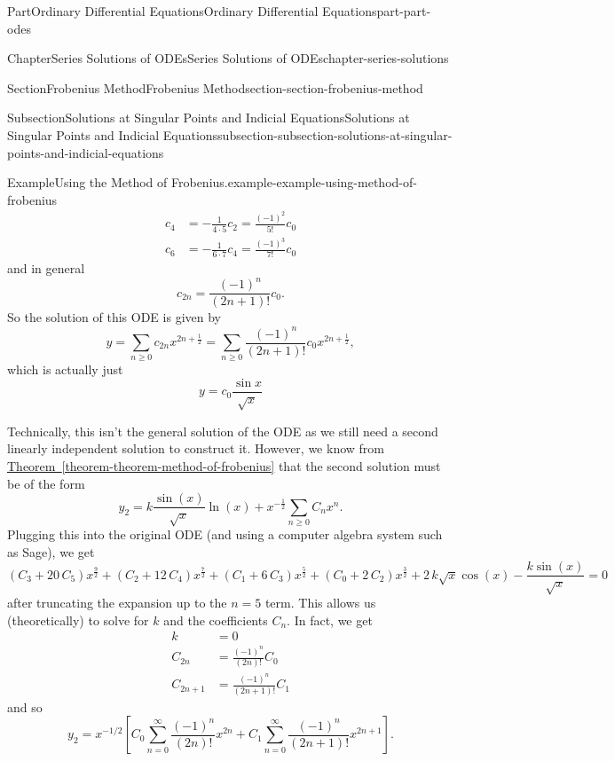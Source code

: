 \documentclass[twoside,10pt,]{book}
\newcommand{\xreffont}{\relax}
\numberwithin{equation}{part}
\begin{document}
\begin{partptx}{Part}{Ordinary Differential Equations}{}{Ordinary Differential Equations}{}{}{part-part-odes}
\begin{chapterptx}{Chapter}{Series Solutions of ODEs}{}{Series Solutions of ODEs}{}{}{chapter-series-solutions}
\begin{sectionptx}{Section}{Frobenius Method}{}{Frobenius Method}{}{}{section-section-frobenius-method}
\begin{subsectionptx}{Subsection}{Solutions at Singular Points and Indicial Equations}{}{Solutions at Singular Points and Indicial Equations}{}{}{subsection-subsection-solutions-at-singular-points-and-indicial-equations}
\begin{example}{Example}{Using the Method of Frobenius.}{example-example-using-method-of-frobenius}
\begin{align*}
c_{4} &= -\frac{1}{4\cdot5}c_{2} = \frac{(-1)^{2}}{5!}c_{0}\\
c_{6} &= -\frac{1}{6\cdot7}c_{4} = \frac{(-1)^{3}}{7!}c_{0}
\end{align*}
and in general%
\begin{equation*}
c_{2n} = \frac{(-1)^{n}}{(2n+1)!}c_{0}.
\end{equation*}
So the solution of this ODE is given by%
\begin{equation*}
y = \sum_{n\geq0}c_{2n}x^{2n+\frac{1}{2}} = \sum_{n\geq0}\frac{(-1)^{n}}{(2n+1)!}c_{0}x^{2n+\frac{1}{2}},
\end{equation*}
which is actually just%
\begin{equation*}
y = c_{0}\frac{\sin x}{\sqrt{x}}
\end{equation*}
%
\par
Technically, this isn't the general solution of the ODE as we still need a second linearly independent solution to construct it. However, we know from \hyperref[theorem-theorem-method-of-frobenius]{Theorem~{\xreffont\ref{theorem-theorem-method-of-frobenius}}} that the second solution must be of the form%
\begin{equation*}
y_2 = k\frac{\sin(x)}{\sqrt{x}}\ln(x) + x^{-\frac{1}{2}}\sum_{n\geq0}C_n x^n.
\end{equation*}
Plugging this into the original ODE (and using a computer algebra system such as Sage), we get%
\begin{equation*}
{\left(C_{3} + 20 \, C_{5}\right)} x^{\frac{9}{2}} + {\left(C_{2} + 12 \, C_{4}\right)} x^{\frac{7}{2}} + {\left(C_{1} + 6 \, C_{3}\right)} x^{\frac{5}{2}} + {\left(C_{0} + 2 \, C_{2}\right)} x^{\frac{3}{2}} + 2 \, k \sqrt{x} \cos\left(x\right) - \frac{k \sin\left(x\right)}{\sqrt{x}} = 0
\end{equation*}
after truncating the expansion up to the \(n=5\) term. This allows us (theoretically) to solve for \(k\) and the coefficients \(C_n\). In fact, we get%
\begin{align*}
k &= 0\\
C_{2n} &= \frac{(-1)^n}{(2n)!}C_0\\
C_{2n+1} &= \frac{(-1)^n}{(2n+1)!}C_1
\end{align*}
and so%
\begin{equation*}
y_2 = x^{-1/2}\left[C_0\sum_{n=0}^{\infty}\frac{(-1)^n}{(2n)!}x^{2n} + C_1 \sum_{n=0}^{\infty}\frac{(-1)^n}{(2n+1)!}x^{2n+1}\right].
\end{equation*}

\end{example}
\end{subsectionptx}
\end{sectionptx}
\end{chapterptx}
\end{partptx}
\end{document}
